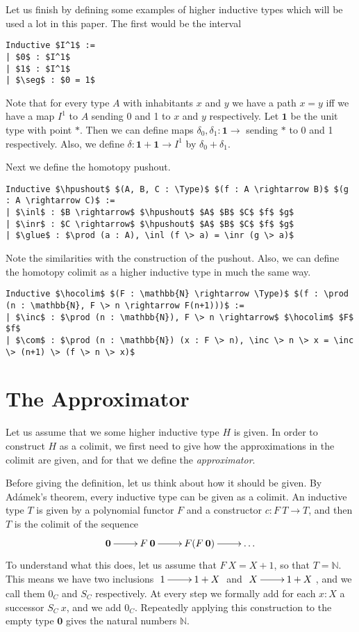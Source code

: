 \documentclass[a4paper,UKenglish]{lipics-v2016}
\newcommand{\zero}[0]{\textbf{0}}
\newcommand{\one}[0]{\textbf{1}}
\newcommand{\hpushout}[0]{\operatorname{\textbf{hpushout}}}
\newcommand{\hocolim}[0]{\operatorname{\textbf{hocolim}}}
\newcommand{\seg}[0]{\operatorname{\textbf{seg}}}
\newcommand{\inl}[0]{\operatorname{\textbf{inl}}}
\newcommand{\inr}[0]{\operatorname{\textbf{inr}}}
\newcommand{\glue}[0]{\operatorname{\textbf{glue}}}
\newcommand{\inc}[0]{\operatorname{\textbf{inc}}}
\newcommand{\com}[0]{\operatorname{\textbf{com}}}
\newcommand{\Type}[0]{\operatorname{\textsc{Type}}}
\newcommand{\pt}[0]{*}
\begin{document}
Let us finish by defining some examples of higher inductive types which will be used a lot in this paper.
The first would be the interval
\lstset{language=Coq}
\begin{lstlisting}
Inductive $I^1$ :=
| $0$ : $I^1$
| $1$ : $I^1$
| $\seg$ : $0 = 1$
\end{lstlisting}
Note that for every type $A$ with inhabitants $x$ and $y$ we have a path $x = y$ iff we have a map $I^1$ to $A$ sending 0 and 1 to $x$ and $y$ respectively.
Let $\one$ be the unit type with point $\pt$.
Then we can define maps $\delta_0, \delta_1 : \one \rightarrow$ sending $\pt$ to 0 and 1 respectively.
Also, we define $\delta : \one + \one \rightarrow I^1$ by $\delta_0 + \delta_1$.

Next we define the homotopy pushout.
\lstset{language=Coq}
\begin{lstlisting}
Inductive $\hpushout$ $(A, B, C : \Type)$ $(f : A \rightarrow B)$ $(g : A \rightarrow C)$ :=
| $\inl$ : $B \rightarrow$ $\hpushout$ $A$ $B$ $C$ $f$ $g$
| $\inr$ : $C \rightarrow$ $\hpushout$ $A$ $B$ $C$ $f$ $g$
| $\glue$ : $\prod (a : A), \inl (f \> a) = \inr (g \> a)$
\end{lstlisting}
Note the similarities with the construction of the pushout.
Also, we can define the homotopy colimit as a higher inductive type in much the same way.
\lstset{language=Coq}
\begin{lstlisting}
Inductive $\hocolim$ $(F : \mathbb{N} \rightarrow \Type)$ $(f : \prod (n : \mathbb{N}, F \> n \rightarrow F(n+1)))$ :=
| $\inc$ : $\prod (n : \mathbb{N}), F \> n \rightarrow$ $\hocolim$ $F$ $f$
| $\com$ : $\prod (n : \mathbb{N}) (x : F \> n), \inc \> n \> x = \inc \> (n+1) \> (f \> n \> x)$
\end{lstlisting}

\section{The Approximator}
\label{sec:approximator}
Let us assume that we some higher inductive type $H$ is given.
In order to construct $H$ as a colimit, we first need to give how the approximations in the colimit are given, and for that we define the \emph{approximator}.

Before giving the definition, let us think about how it should be given.
By Ad\'amek's theorem, every inductive type can be given as a colimit.
An inductive type $T$ is given by a polynomial functor $F$ and a constructor $c : F \> T \rightarrow T$, and then $T$ is the colimit of the sequence
\[
\xymatrix
{
	\zero \ar[r] & F \> \zero  \ar[r] & F(F \> \zero) \ar[r] & \ldots
}
\]
To understand what this does, let us assume that $F \> X = X + 1$, so that $T = \mathbb{N}$.
This means we have two inclusions  $\xymatrix{1 \ar[r] & 1+X}$ and  $\xymatrix{X \ar[r] & 1+X}$, and we call them $0_C$ and $S_C$ respectively.
At every step we formally add for each $x : X$ a successor $S_C \> x$, and we add $0_C$.
Repeatedly applying this construction to the empty type $\zero$ gives the natural numbers $\mathbb{N}$.
\end{document}
